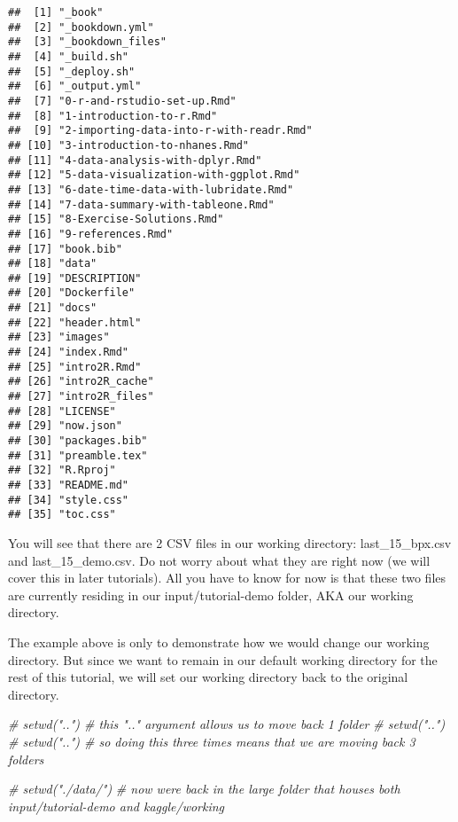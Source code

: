 \documentclass[
]{book}
\newenvironment{Shaded}{\begin{snugshade}}{\end{snugshade}}
\newcommand{\CommentTok}[1]{\textcolor[rgb]{0.56,0.35,0.01}{\textit{#1}}}
\begin{document}
\begin{verbatim}
##  [1] "_book"                                 
##  [2] "_bookdown.yml"                         
##  [3] "_bookdown_files"                       
##  [4] "_build.sh"                             
##  [5] "_deploy.sh"                            
##  [6] "_output.yml"                           
##  [7] "0-r-and-rstudio-set-up.Rmd"            
##  [8] "1-introduction-to-r.Rmd"               
##  [9] "2-importing-data-into-r-with-readr.Rmd"
## [10] "3-introduction-to-nhanes.Rmd"          
## [11] "4-data-analysis-with-dplyr.Rmd"        
## [12] "5-data-visualization-with-ggplot.Rmd"  
## [13] "6-date-time-data-with-lubridate.Rmd"   
## [14] "7-data-summary-with-tableone.Rmd"      
## [15] "8-Exercise-Solutions.Rmd"              
## [16] "9-references.Rmd"                      
## [17] "book.bib"                              
## [18] "data"                                  
## [19] "DESCRIPTION"                           
## [20] "Dockerfile"                            
## [21] "docs"                                  
## [22] "header.html"                           
## [23] "images"                                
## [24] "index.Rmd"                             
## [25] "intro2R.Rmd"                           
## [26] "intro2R_cache"                         
## [27] "intro2R_files"                         
## [28] "LICENSE"                               
## [29] "now.json"                              
## [30] "packages.bib"                          
## [31] "preamble.tex"                          
## [32] "R.Rproj"                               
## [33] "README.md"                             
## [34] "style.css"                             
## [35] "toc.css"
\end{verbatim}

You will see that there are 2 CSV files in our working directory: last\_15\_bpx.csv and last\_15\_demo.csv. Do not worry about what they are right now (we will cover this in later tutorials). All you have to know for now is that these two files are currently residing in our input/tutorial-demo folder, AKA our working directory.

The example above is only to demonstrate how we would change our working directory. But since we want to remain in our default working directory for the rest of this tutorial, we will set our working directory back to the original directory.

\begin{Shaded}
\begin{Highlighting}[]
\CommentTok{\# setwd("..") \# this ".." argument allows us to move back 1 folder}
\CommentTok{\# setwd("..") }
\CommentTok{\# setwd("..") \# so doing this three times means that we are moving back 3 folders}


\CommentTok{\# setwd("./data/") }
\CommentTok{\# now we\textquotesingle{}re back in the large folder that houses both input/tutorial{-}demo and kaggle/working}
\end{Highlighting}
\end{Shaded}
\end{document}
